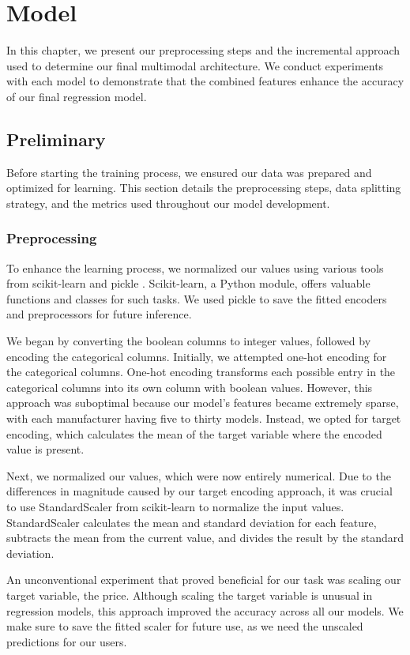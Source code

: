 \chapter{Model}
In this chapter, we present our preprocessing steps and the incremental approach used to determine our final multimodal architecture. We conduct experiments with each model to demonstrate that the combined features enhance the accuracy of our final regression model.

\section{Preliminary}
Before starting the training process, we ensured our data was prepared and optimized for learning. This section details the preprocessing steps, data splitting strategy, and the metrics used throughout our model development.

\subsection{Preprocessing}
To enhance the learning process, we normalized our values using various tools from scikit-learn \cite{scikit-learn} and pickle \cite{pickle}. Scikit-learn, a Python module, offers valuable functions and classes for such tasks. We used pickle to save the fitted encoders and preprocessors for future inference.

We began by converting the boolean columns to integer values, followed by encoding the categorical columns. Initially, we attempted one-hot encoding for the categorical columns. One-hot encoding transforms each possible entry in the categorical columns into its own column with boolean values. However, this approach was suboptimal because our model's features became extremely sparse, with each manufacturer having five to thirty models. Instead, we opted for target encoding, which calculates the mean of the target variable where the encoded value is present.

Next, we normalized our values, which were now entirely numerical. Due to the differences in magnitude caused by our target encoding approach, it was crucial to use StandardScaler from scikit-learn to normalize the input values. StandardScaler calculates the mean and standard deviation for each feature, subtracts the mean from the current value, and divides the result by the standard deviation.

An unconventional experiment that proved beneficial for our task was scaling our target variable, the price. Although scaling the target variable is unusual in regression models, this approach improved the accuracy across all our models. We make sure to save the fitted scaler for future use, as we need the unscaled predictions for our users.

